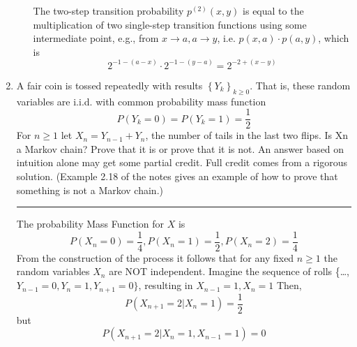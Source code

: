 \documentclass{article} %
\theoremstyle{plain}
\theoremstyle{case}
\begin{document}
\begin{enumerate}[label={\fbox{\textbf{Exercise \#\arabic* :}}}]
\begin{enumerate}
       The two-step transition probability $p^{(2)}(x, y)$ is equal to 
       the multiplication of two single-step transition functions using
       some intermediate point, e.g., from
       $x \rightarrow a, a \rightarrow y$, i.e.
       $p(x,a) \cdot p(a,y)$, which is
       \[ 2^{-1-(a-x)} \cdot 2^{-1-(y-a)} = 2^{-2 + (x-y)} \]
    \end{enumerate} 
\newpage
  \item A fair coin is tossed repeatedly with results $\left\{Y_k\right\}_{k \geq 0}$. That is, these random variables are i.i.d.  with common
    probability mass function
    \[ P(Y_k=0) = P(Y_k =1) = \frac{1}{2}  \]
    For $n \geq 1$ let $X_n = Y_{n-1} + Y_n$, the number of tails in the
    last two flips. Is Xn a Markov chain?
    Prove that it is or prove that it is not. An answer based on intuition
    alone may get some partial credit. Full credit comes from a rigorous
    solution. (Example 2.18 of the notes gives an example of how to prove
    that something is not a Markov chain.)
\par\noindent\rule{\textwidth}{0.1pt}
    The probability Mass Function for $X$ is 
    \[ P(X_n=0) = \frac{1}{4},  P(X_n=1) = \frac{1}{2},
          P(X_n=2)= \frac{1}{4}    \]
    From the construction of the process it follows that for any
    fixed $n \geq 1$ the random variables $X_n$ are NOT independent.
    Imagine the sequence of rolls
    \{\dots, $Y_{n-1}=0, Y_{n}=1, Y_{n+1}=0\}$, resulting in 
    $X_{n-1}=1, X_{n}=1$
    Then,
    \[ P(X_{n+1} = 2 | X_n = 1) = \frac{1}{2}  \]
    but
    \[ P(X_{n+1} = 2 | X_n = 1, X_{n-1} = 1) = 0  \]
    
\end{enumerate}

%
%
\end{document}
